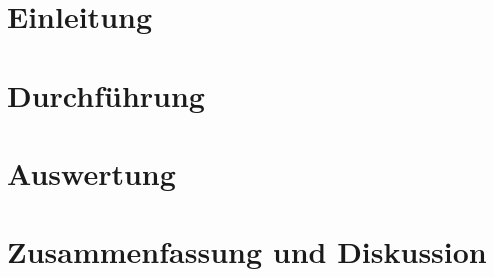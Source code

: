 \documentclass{include/berichtclass}
\begin{document}
\FrontMatter

\begingroup
    \let\clearpage\relax
    \pagestyle{plain}
    \newpage
    \tableofcontents
\endgroup

\MainMatter
\begingroup
    \let\clearpage\relax

    \chapter{Einleitung}
    

    \chapter{Durchführung}
    

    \newpage
    \chapter{Auswertung}
    

    \chapter{Zusammenfassung und Diskussion}
    
\endgroup

\TheBibliography


\end{document}
